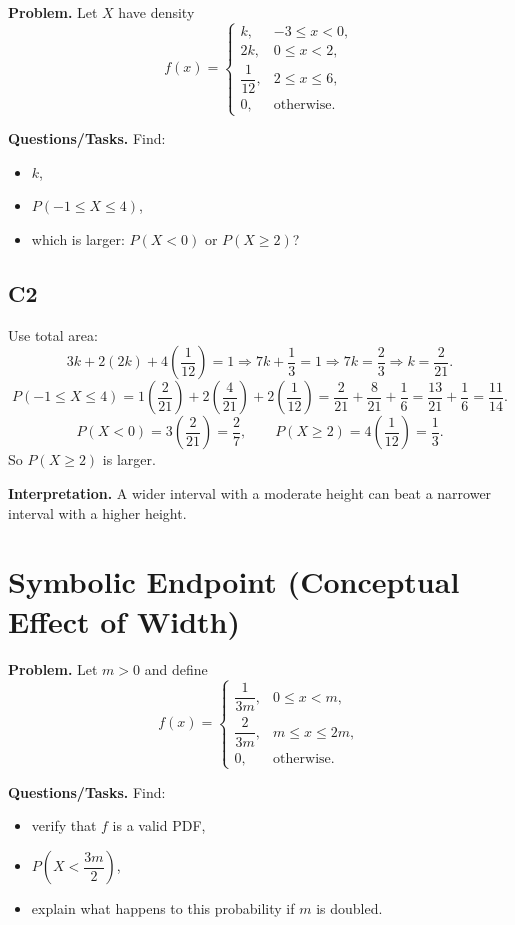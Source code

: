 \textbf{Problem.}
Let $X$ have density
\[
f(x)=
\begin{cases}
k, & -3\le x<0,\\
2k, & 0\le x<2,\\
\dfrac{1}{12}, & 2\le x\le 6,\\
0, & \text{otherwise.}
\end{cases}
\]

\textbf{Questions/Tasks.}
Find:
\begin{itemize}
    \item[(a)] $k$,
    \item[(b)] $P(-1\le X\le 4)$,
    \item[(c)] which is larger: $P(X<0)$ or $P(X\ge 2)$?
\end{itemize}

\subsection*{C2}
Use total area:
\[
3k+2(2k)+4\left(\frac{1}{12}\right)=1
\Rightarrow 7k+\frac{1}{3}=1
\Rightarrow 7k=\frac{2}{3}
\Rightarrow k=\frac{2}{21}.
\]
\[
P(-1\le X\le 4)=1\left(\frac{2}{21}\right)+2\left(\frac{4}{21}\right)+2\left(\frac{1}{12}\right)
=\frac{2}{21}+\frac{8}{21}+\frac{1}{6}
=\frac{13}{21}+\frac{1}{6}
=\frac{11}{14}.
\]
\[
P(X<0)=3\left(\frac{2}{21}\right)=\frac{2}{7},
\qquad
P(X\ge 2)=4\left(\frac{1}{12}\right)=\frac{1}{3}.
\]
So $P(X\ge 2)$ is larger.

\textbf{Interpretation.}
A wider interval with a moderate height can beat a narrower interval with a higher height.

\section{Symbolic Endpoint (Conceptual Effect of Width)}

\textbf{Problem.}
Let $m>0$ and define
\[
f(x)=
\begin{cases}
\dfrac{1}{3m}, & 0\le x<m,\\
\dfrac{2}{3m}, & m\le x\le 2m,\\
0, & \text{otherwise.}
\end{cases}
\]

\textbf{Questions/Tasks.}
Find:
\begin{itemize}
    \item[(a)] verify that $f$ is a valid PDF,
    \item[(b)] $P\left(X<\dfrac{3m}{2}\right)$,
    \item[(c)] explain what happens to this probability if $m$ is doubled.
\end{itemize}

